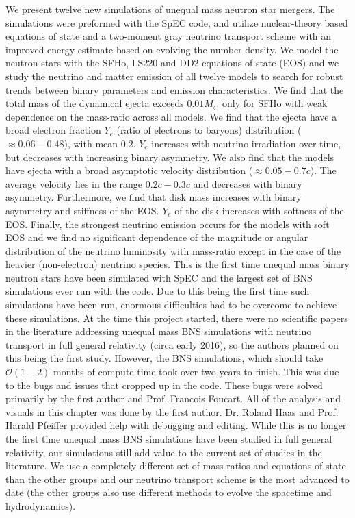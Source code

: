 We present twelve new simulations of unequal mass neutron star mergers. The simulations were preformed with the SpEC code, and utilize nuclear-theory based equations of state and a two-moment gray neutrino transport scheme with an improved energy estimate based on evolving the number density. We model the neutron stars with the SFHo, LS220 and DD2 equations of state (EOS) and we study the neutrino and matter emission of all twelve models to search for robust trends between binary parameters and emission characteristics. We find that the total mass of the dynamical ejecta exceeds $0.01M_\odot$ only for SFHo with weak dependence on the mass-ratio across all models.  We find that the  ejecta have a broad electron fraction $Y_e$ (ratio of electrons to baryons) distribution ($\approx 0.06-0.48$), with mean $0.2$. $Y_e$ increases with neutrino irradiation over time, but decreases with increasing binary asymmetry. We also find that the models have ejecta with a broad asymptotic velocity distribution ($\approx 0.05-0.7c$). The average velocity lies in the range $0.2c - 0.3c$ and decreases with binary asymmetry. Furthermore, we find that disk mass increases with binary asymmetry and stiffness of the EOS. $Y_e$ of the disk increases with softness of the EOS. Finally, the strongest neutrino emission occurs for the models with soft EOS and we find no significant dependence of the magnitude or angular distribution of the neutrino luminosity with mass-ratio except in the case of the heavier (non-electron) neutrino species. This is the first time unequal mass binary neutron stars have been simulated with SpEC and the largest set of BNS simulations ever run with the code. Due to this being the first time such simulations have been run, enormous difficulties had to be overcome to achieve these simulations. At the time this project started, there were no scientific papers in the literature addressing unequal mass BNS simulations with neutrino transport in full general relativity (circa early 2016), so the authors planned on this being the first study. However, the BNS simulations, which should take $\mathcal{O}(1-2)$ months of compute time took over two years to finish. This was due to the bugs and issues that cropped up in the code. These bugs were solved primarily by the first author and Prof. Francois Foucart. All of the analysis and visuals in this chapter was done by the first author. Dr. Roland Haas and Prof. Harald Pfeiffer provided help with debugging and editing. While this is no longer the first time unequal mass BNS simulations have been studied in full general relativity, our simulations still add value to the current set of studies in the literature. We use a completely different set of mass-ratios and equations of state than the other groups and our neutrino transport scheme is the most advanced to date (the other groups also use different methods to evolve the spacetime and hydrodynamics).

